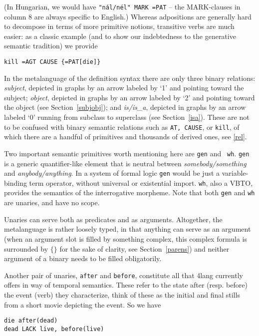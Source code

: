\documentclass[11pt,bookmarks,bookmarksnumbered,naturalnames,plainpages=false,pdftex,colorlinks=true,urlcolor=blue,bookmarksdepth=subsection,plainpages=false]{paper}
\begin{document}
\noindent
(In Hungarian, we would have {\tt "n\'al/n\'el" MARK =PAT} -- the MARK-clauses
in column 8 are always specific to English.) Whereas adpositions are generally
hard to decompose in terms of more primitive notions, transitive verbs are
much easier: as a classic example (and to show our indebtedness to the
generative semantic tradition) we provide

\begin{verbatim}
kill =AGT CAUSE {=PAT[die]} 
\end{verbatim}

\noindent
In the metalanguage of the definition syntax there are only three binary
relations: {\it subject}, depicted in graphs by an arrow labeled by `1' and
pointing toward the subject; {\it object}, depicted in graphs by an arrow
labeled by `2' and pointing toward the object (see Section~\ref{subjobj}); and
{\it is/is\_a}, depicted in graphs by an arrow labeled `0' running from
subclass to superclass (see Section~\ref{isa}). These are not to be confused
with binary semantic relations such as {\tt AT, CAUSE}, or {\tt kill}, of which
there are a handful of primitives and thousands of derived ones, see \ref{rel}.

Two important semantic primitives worth mentioning here are {\tt gen} and {\tt
  wh}.  {\tt gen} is a generic quantifier-like element that is neutral between
{\it somebody/something} and {\it anybody/anything}. In a system of formal
logic {\tt gen} would be just a variable-binding term operator, without
universal or existential import.  {\tt wh}, also a VBTO, provides the
semantics of the interrogative morpheme. Note that both {\tt gen} and {\tt wh}
are unaries, and have no scope. 

Unaries can serve both as predicates and as arguments.  Altogether, the
metalanguage is rather loosely typed, in that anything can serve as an
argument (when an argument slot is filled by something complex, this complex
formula is surrounded by $\{ \}$ for the sake of clarity, see
Section~\ref{parens}) and neither argument of a binary needs to be filled
obligatorily. 

Another pair of unaries, {\tt after} and {\tt before}, constitute all that
4lang currently offers in way of temporal semantics. These refer to the state 
after (resp. before) the event (verb) they characterize, think of these as
the initial and final stills from a short movie depicting the event. So we have 

\begin{verbatim}
die after(dead)
dead LACK live, before(live)
\end{verbatim}
\end{document}
